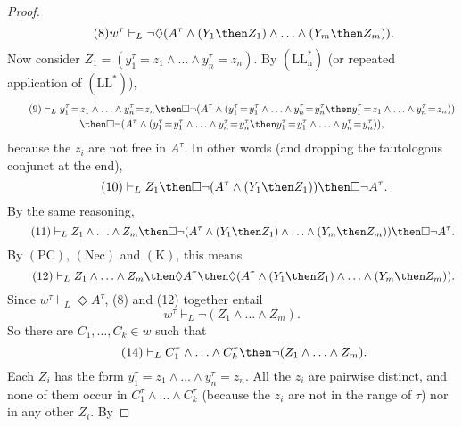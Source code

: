 \documentclass[11pt]{woarticle}
\theoremstyle{break}
\theoremstyle{nonumberplain}
\newcommand{\1}{\;\,|\;\,}
\newcommand{\T}[1]{\ensuremath{(\mathrm{ #1})}}
\begin{document}
\begin{proof}
  \begin{equation}\tag{8}
    w^\tau \vdash_L \neg  \Diamond(A^\tau \land (Y_1 \then
    Z_1)\land \ldots\land (Y_m \then Z_m)).
  \end{equation}
  Now consider $Z_1 = (y_1^\tau\!=\!z_1 \land \ldots \land
  y_n^\tau\!=\!z_n)$. By \T{LL_n^*} (or repeated application of $\T{LL^*}$),
  \begin{multline}\tag{9}
    \vdash_L y_1^\tau\!=\!z_1 \land \ldots \land y_n^\tau\!=\!z_n
    \then \Box\neg (A^\tau \land (y_1^\tau\!=\!y_1^\tau \land\ldots\land
    y_n^\tau\!=\!y_n^\tau \then y_1^\tau\!=\!z_1 \land\ldots\land y_n^\tau\!=\!z_n))\\
    \then \Box\neg (A^\tau \land (y_1^\tau\!=\!y_1^\tau \land\ldots\land
    y_n^\tau\!=\!y_n^\tau \then y_1^\tau\!=\!y_1^\tau \land\ldots\land y_n^\tau\!=\!y_n^\tau)),
  \end{multline}
  because the $z_i$ are not free in $A^\tau$. In other words (and
  dropping the tautologous conjunct at the end),
  \begin{equation}\tag{10}
    \vdash_L Z_1 \then \Box \neg (A^\tau \land (Y_1 \then Z_1)) 
    \then \Box \neg A^\tau .
  \end{equation}
  By the same reasoning,
  \begin{equation}\tag{11}
    \vdash_L Z_1 \land \ldots\land Z_m \then 
    \Box \neg (A^\tau \land (Y_1 \then Z_1) \land \ldots\land (Y_m \then Z_m)) 
    \then \Box \neg A^\tau .
  \end{equation}
  By \T{PC}, \T{Nec} and \T{K}, this means
  \begin{equation}\tag{12}
    \vdash_L Z_1\land\ldots\land Z_m \then \Diamond A^\tau \then
    \Diamond (A^\tau \land (Y_1 \then Z_1) \land\ldots\land (Y_m\then Z_m)).
  \end{equation}
  Since $w^\tau \vdash_L \Diamond A^\tau$, (8) and (12) together entail
  \begin{equation}\tag{13}
    w^\tau \vdash_L \neg (Z_1 \land\ldots\land Z_m).
  \end{equation}
  So there are $C_1,\ldots,C_k \in w$ such that
  \begin{equation}\tag{14}
    \vdash_L C_1^\tau \land \ldots \land C_k^\tau \then \neg 
    (Z_1 \land \ldots \land Z_m).
  \end{equation}
  Each $Z_i$ has the form $y_1^\tau\!=\!z_1 \land \ldots \land
  y_n^\tau\!=\!z_n$. All the $z_i$ are pairwise distinct, and none of
  them occur in $C_1^\tau \land \ldots \land C_k^\tau$ (because the
  $z_i$ are not in the range of $\tau$) nor in any other $Z_i$. By

\end{proof}
\end{document}
